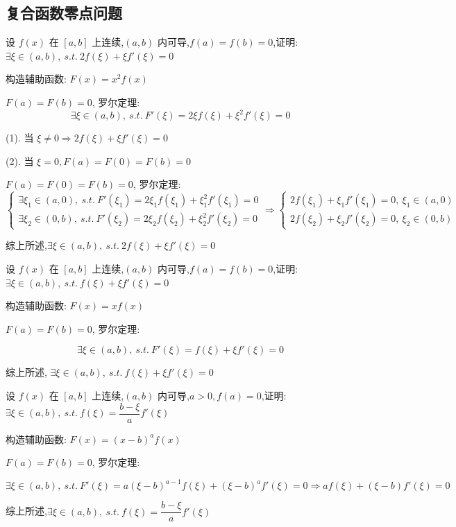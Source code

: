 \subsection{复合函数零点问题}

\begin{proposition}
	设 $f(x)$ 在 $[a,b]$ 上连续,$(a,b)$ 内可导,$f(a)=f(b)=0$,证明: $\exists \xi\in(a,b),\ s.t.\ 2f(\xi)+\xi f'(\xi)=0$
\end{proposition}
\begin{solution}

	构造辅助函数: $F(x)=x^2f(x)$

	$F(a) = F(b) = 0$, 罗尔定理:
	$$\exists \xi\in(a,b),\ s.t.\ F'(\xi)=2\xi f(\xi)+\xi^2f'(\xi)=0$$

	(1). 当 $\xi\neq 0\Rightarrow 2f(\xi)+\xi f'(\xi)=0$

	(2). 当 $\xi=0, F(a)=F(0)=F(b)=0$

	$F(a) = F(0) = F(b) = 0$, 罗尔定理:
	$$\begin{cases}
		\exists \xi_{1}\in(a,0),\ s.t.\ F'(\xi_{1})=2\xi_{1} f(\xi_{1})+\xi_{1}^2f'(\xi_{1})=0 \\
		\exists \xi_{2}\in(0,b),\ s.t.\ F'(\xi_{2})=2\xi_{2} f(\xi_{2})+\xi_{2}^2f'(\xi_{2})=0
	\end{cases}\Rightarrow
	\begin{cases}
		2f(\xi_{1})+\xi_{1}f'(\xi_{1})=0,\ \xi_{1}\in(a,0) \\
		2f(\xi_{2})+\xi_{2}f'(\xi_{2})=0,\ \xi_{2}\in(0,b)
	\end{cases}$$

	综上所述,$\exists \xi\in(a,b),\ s.t.\ 2f(\xi)+\xi f'(\xi)=0$
\end{solution}

\begin{proposition}
	设 $f(x)$ 在 $[a,b]$ 上连续,$(a,b)$ 内可导,$f(a)=f(b)=0$,证明: $\exists \xi\in(a,b),\ s.t.\ f(\xi)+\xi f'(\xi)=0$
\end{proposition}
\begin{solution}

	构造辅助函数: $F(x)=xf(x)$
	
	$F(a)=F(b)=0$, 罗尔定理:
	
	$$\exists \xi\in(a,b),\ s.t.\ F'(\xi)= f(\xi)+\xi f'(\xi)=0$$

	综上所述, $\exists \xi\in(a,b),\ s.t.\ f(\xi)+\xi f'(\xi)=0$
\end{solution}

\begin{proposition}
	设 $f(x)$ 在 $[a,b]$ 上连续,$(a,b)$ 内可导,$a>0,f(a)=0$,证明: $\exists \xi\in(a,b),\ s.t.\ f(\xi)=\dfrac{b-\xi}{a}f'(\xi)$
\end{proposition}
\begin{solution}
    
	构造辅助函数: $F(x)=(x-b)^af(x)$
	
	$F(a)=F(b)=0$, 罗尔定理:

	$$\exists \xi\in(a,b),\ s.t.\ F'(\xi)= a(\xi-b)^{a-1}f(\xi)+(\xi-b)^a f'(\xi)=0\Rightarrow af(\xi)+(\xi-b) f'(\xi)=0$$

	综上所述,$\exists \xi\in(a,b),\ s.t.\ f(\xi)=\dfrac{b-\xi}{a}f'(\xi)$
\end{solution}

